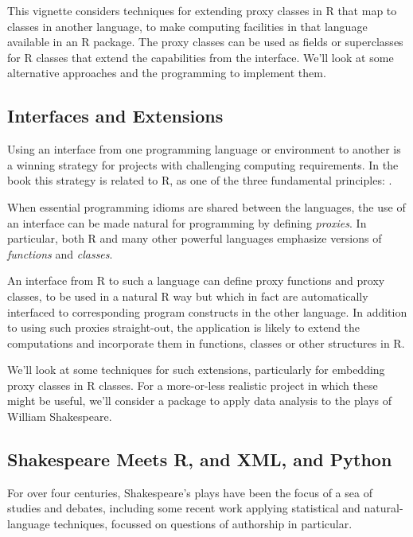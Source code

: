 \documentclass{article}
\begin{document}
This vignette considers techniques for extending proxy classes in R
that map to classes in another language, to make computing facilities
in that language available in an R package. The proxy classes can be
used as fields or superclasses for R classes that extend the
capabilities from the interface. We'll look at some alternative
approaches and the programming to implement them.

\subsection{Interfaces and
  Extensions}\label{interfaces-and-extensions}

Using an interface from one programming language or environment to
another is a winning strategy for projects with challenging computing
requirements. In the  book \cite[hereafter
\textbf{XR}]{extR} this strategy is related to R, as one of the three
fundamental principles: .

When essential programming idioms are shared between the languages,
the use of an interface can be made natural for programming by
defining \emph{proxies}. In particular, both R and many other powerful
languages emphasize versions of \emph{functions} and \emph{classes}.

An interface from R to such a language can define proxy functions and
proxy classes, to be used in a natural R way but which in fact are
automatically interfaced to corresponding program constructs in the
other language. In addition to using such proxies straight-out, the
application is likely to extend the computations and incorporate them
in functions, classes or other structures in R.

We'll look at some techniques for such extensions, particularly for
embedding proxy classes in R classes. For a more-or-less realistic
project in which these might be useful, we'll consider a package to
apply data analysis to the plays of William Shakespeare.

\subsection{Shakespeare Meets R, and XML, and
  Python}\label{shakespeare-meets-r-and-xml-and-python}

For over four centuries, Shakespeare's plays have been the focus of a
sea of studies and debates, including some recent work applying
statistical and natural-language techniques, focussed on questions of
authorship in particular.
\end{document}
